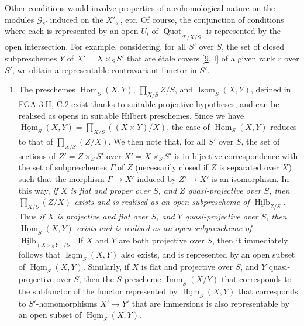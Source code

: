 \documentclass{article}
\providecommand{\tightlist}{%
  \setlength{\itemsep}{0pt}\setlength{\parskip}{0pt}}
\newcommand{\oldpage}[1]{\marginpar{\footnotesize$\Big\vert$ \textit{p.~#1}}}
\theoremstyle{definition}
\theoremstyle{definition}
\theoremstyle{definition}
\theoremstyle{definition}
\theoremstyle{remark}
\begin{document}
Other conditions would involve properties of a cohomological nature on the modules \({\mathscr{G}}_{s'}\) induced on the \(X'_{s'}\), etc.
Of course, the conjunction of conditions where each is represented by an open \(U_i\) of \(\underline{\operatorname{Quot}}_{{{\mathscr{F}}/X/S}}\) is represented by the open intersection.
For example, considering, for all \(S'\) over \(S\), the set of closed subpreschemes \(Y\) of \(X'=X\times_S S'\) that are étale covers {[}\protect\hyperlink{ref-Gro1960b}{9}, I{]} of a given rank \(r\) over \(S'\), we obtain a representable contravariant functor in \(S'\).

\begin{enumerate}
\def\labelenumi{\alph{enumi}.}
\setcounter{enumi}{2}
\tightlist
\item
  The preschemes \(\underline{\operatorname{Hom}}_S(X,Y)\), \(\prod_{X/S}Z/S\), and \(\underline{\operatorname{Isom}}_S(X,Y)\), defined in \protect\hyperlink{fga-3-ii-section-C.2}{FGA 3.II, C.2} exist thanks to suitable projective hypotheses, and can be realised as opens in suitable Hilbert preschemes.
  Since we have \(\underline{\operatorname{Hom}}_S(X,Y)=\prod_{X/S}((X\times Y)/X)\), the case of \(\operatorname{Hom}_S(X,Y)\) reduces to that of \(\prod_{X/S}(Z/X)\).
  We then note that, for all \(S'\) over \(S\), the set of sections of \(Z'=Z\times_S S'\) over \(X'=X\times_S S'\) is in bijective correspondence with the set of subpreschemes \(\Gamma\) of \(Z\) (necessarily closed if \(Z\) is separated over \(X\)) such that the morphism \(\Gamma\to X'\) induced by \(Z'\to X'\) is an isomorphism.
  \oldpage{221-20}In this way, \emph{if \(X\) is flat and proper over \(S\), and \(Z\) quasi-projective over \(S\), then \(\prod_{X/S}(Z/X)\) exists and is realised as an open subprescheme of \(\underline{\operatorname{Hilb}}_{Z/S}\).}
  Thus \emph{if \(X\) is projective and flat over \(S\), and \(Y\) quasi-projective over \(S\), then \(\underline{\operatorname{Hom}}_S(X,Y)\) exists and is realised as an open subprescheme of \(\underline{\operatorname{Hilb}}_{(X\times_S Y)/S}\).}
  If \(X\) and \(Y\) are both projective over \(S\), then it immediately follows that \(\underline{\operatorname{Isom}}_S(X,Y)\) also exists, and is represented by an open subset of \(\underline{\operatorname{Hom}}_S(X,Y)\).
  Similarly, if \(X\) is flat and projective over \(S\), and \(Y\) quasi-projective over \(S\), then the \(S\)-prescheme \(\underline{\operatorname{Imm}}_S(X/Y)\) that corresponds to the subfunctor of the functor represented by \(\underline{\operatorname{Hom}}_S(X,Y)\) that corresponds to \(S'\)-homomorphisms \(X'\to Y'\) that are immersions is also representable by an open subset of \(\underline{\operatorname{Hom}}_S(X,Y)\).
\end{enumerate}
\end{document}
